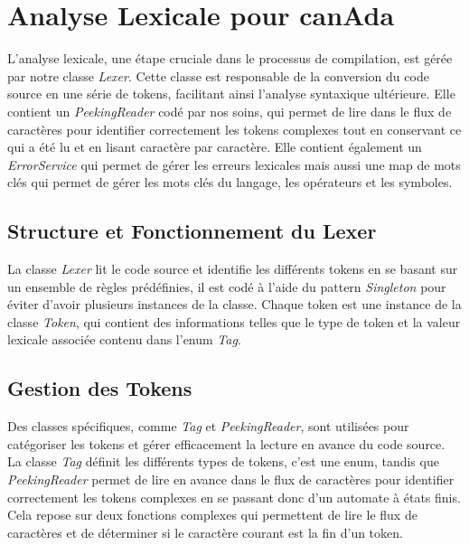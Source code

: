 \documentclass[french,a4paper]{article}
\begin{document}
    \section{Analyse Lexicale pour canAda}\label{sec:analyse-lexicale-pour-canada}

    L'analyse lexicale, une étape cruciale dans le processus de compilation, est gérée par notre classe \textit{Lexer}.
    Cette classe est responsable de la conversion du code source en une série de tokens, facilitant ainsi l'analyse syntaxique ultérieure.
    Elle contient un \textit{PeekingReader} codé par nos soins, qui permet de lire dans le flux de caractères pour identifier correctement les tokens complexes tout en conservant ce qui a été lu et en lisant caractère par caractère.
    Elle contient également un \textit{ErrorService} qui permet de gérer les erreurs lexicales mais aussi une map de mots clés qui permet de gérer les mots clés du langage, les opérateurs et les symboles.

    \subsection{Structure et Fonctionnement du Lexer}\label{subsec:structure-et-fonctionnement-du-lexer}

    La classe \textit{Lexer} lit le code source et identifie les différents tokens en se basant sur un ensemble de règles prédéfinies, il est codé à l'aide du pattern \textit{Singleton} pour éviter d'avoir plusieurs instances de la classe.
    Chaque token est une instance de la classe \textit{Token}, qui contient des informations telles que le type de token et la valeur lexicale associée contenu dans l'enum \textit{Tag}.

    \subsection{Gestion des Tokens}\label{subsec:gestion-des-tokens}

    Des classes spécifiques, comme \textit{Tag} et \textit{PeekingReader}, sont utilisées pour catégoriser les tokens et gérer efficacement la lecture en avance du code source.
    La classe \textit{Tag} définit les différents types de tokens, c'est une enum, tandis que \textit{PeekingReader} permet de lire en avance dans le flux de caractères pour identifier correctement les tokens complexes en se passant donc d'un automate à états finis.
    Cela repose sur deux fonctions complexes qui permettent de lire le flux de caractères et de déterminer si le caractère courant est la fin d'un token.
\end{document}
